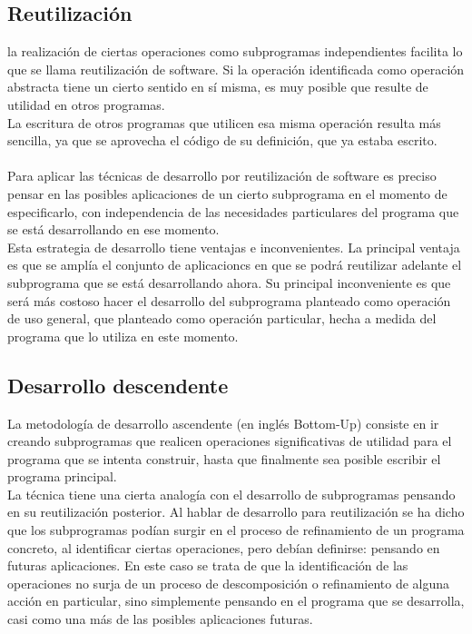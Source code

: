 \documentclass[11pt,a4paper]{article}
\begin{document}
  \subsection{Reutilización}
  la realización de ciertas operaciones como subprogramas independientes facilita lo que se llama reutilización de software. Si la operación identificada
  como operación abstracta tiene un cierto sentido en sí misma, es muy posible
  que resulte de utilidad en otros programas.\\
  La escritura de otros programas que utilicen esa misma
  operación resulta más sencilla, ya que se aprovecha el código de su definición,
  que ya estaba escrito.\\
  \\
  
  Para aplicar las técnicas de desarrollo por reutilización de software es preciso pensar en las posibles aplicaciones de un cierto subprograma en el momento de especificarlo, con independencia de las necesidades particulares del programa que se está desarrollando en ese momento.\\
  Esta estrategia de desarrollo tiene ventajas e inconvenientes. La principal ventaja es que se amplía el conjunto de aplicacioncs en que se podrá reutilizar
  adelante el subprograma que se está desarrollando ahora. Su principal
  inconveniente es que será más costoso hacer el desarrollo del subprograma
  planteado como operación de uso general, que planteado como operación particular, hecha a medida del programa que lo utiliza en este momento.
  \subsection{Desarrollo descendente}
  La metodología de desarrollo ascendente (en inglés Bottom-Up) consiste en ir
  creando subprogramas que realicen operaciones significativas de utilidad para
  el programa que se intenta construir, hasta que finalmente sea posible escribir
  el programa principal.\\
  
  La técnica tiene una cierta analogía con el desarrollo de subprogramas pensando
  en su reutilización posterior. Al hablar de desarrollo para reutilización se
  ha dicho que los subprogramas podían surgir en el proceso de refinamiento de
  un programa concreto, al identificar ciertas operaciones, pero debían definirse:
  pensando en futuras aplicaciones. En este caso se trata de que la identificación
  de las operaciones no surja de un proceso de descomposición o refinamiento de
  alguna acción en particular, sino simplemente pensando en el programa que
  se desarrolla, casi como una más de las posibles aplicaciones futuras.\\
\end{document}
